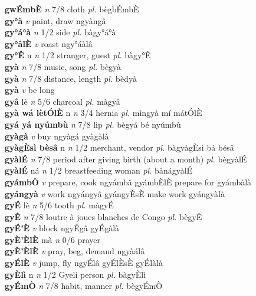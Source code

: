 \documentclass{article}
\begin{document}
{\bf gwÉmbÈ}  {\it n} 7/8 cloth {\it pl.} bègbÉmbÈ         \\ 
{\bf gy°à}  {\it v} paint, draw   ngyàngâ      \\ 
{\bf gy°á°à}  {\it n} 1/2 side {\it pl.} bàgy°á°à         \\ 
{\bf gy°âlÈ}  {\it v} roast   ngy°áàlâ      \\ 
{\bf gy°Ê} n {\it n} 1/2 stranger, guest {\it pl.} bàgy°Ê         \\ 
{\bf gyà}  {\it n} 7/8 music, song {\it pl.} bègyà         \\ 
{\bf gyà}  {\it n} 7/8 distance, length {\it pl.} bèdyà         \\ 
{\bf gyà}  {\it v} be long         \\ 
{\bf gyâ} lè {\it n} 5/6 charcoal {\it pl.} màgyâ         \\ 
{\bf gyà wá lètÓlÈ} n {\it n} 3/4 hernia {\it pl.} mìngyà mí mátÓlÈ         \\ 
{\bf gyá yá nyúmbù}  {\it n} 7/8 lip {\it pl.} bègyá bé nyúmbù         \\ 
{\bf gyàgà}  {\it v} buy   ngyàgá   gyàgàlà   \\ 
{\bf gyàgÈsì bèsâ} n {\it n} 1/2 merchant, vendor {\it pl.} bàgyàgÈsì bá bésâ         \\ 
{\bf gyàlÉ}  {\it n} 7/8 period after giving birth (about a month) {\it pl.} bègyàlÉ         \\ 
{\bf gyàlÉ} ná {\it n} 1/2 breastfeeding woman {\it pl.} bànágyàlÉ         \\ 
{\bf gyámbÒ}  {\it v} prepare, cook   ngyámbâ gyámbÈlÈ prepare for  gyámbàlà   \\ 
{\bf gyángyà}  {\it v} work   ngyángyâ  gyángyÈsÈ make work gyángyàlà   \\ 
{\bf gyÉ} lè {\it n} 5/6 tooth {\it pl.} màgyÉ         \\ 
{\bf gyÊ}  {\it n} 7/8 loutre à joues blanches de Congo {\it pl.} bègyÊ         \\ 
{\bf gyÉ'È}  {\it v} block   ngyÉgâ   gyÉgàlà   \\ 
{\bf gyÈ'ÈlÈ} mà {\it n} 0/6 prayer         \\ 
{\bf gyÈ'ÈlÈ}  {\it v} pray, beg, demand   ngyàálâ      \\ 
{\bf gyÉlÈ}  {\it v} jump, fly   ngyÉlâ  gyÉlÈsÈ gyÉlàlà   \\ 
{\bf gyÈlì} n {\it n} 1/2 Gyeli person {\it pl.} bàgyÈlì         \\ 
{\bf gyÉmÒ}  {\it n} 7/8 habit, manner {\it pl.} bègyÉmÒ         \\ 
\end{document}

